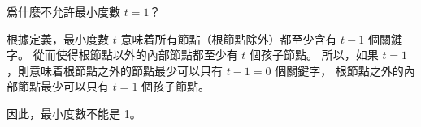 \startEXERCISE
爲什麼不允許最小度數 $t=1$？
\stopEXERCISE

\startANSWER
根據定義，最小度數 $t$ 意味着所有節點（根節點除外）都至少含有 $t-1$ 個關鍵字。
從而使得根節點以外的內部節點都至少有 $t$ 個孩子節點。
所以，如果 $t=1$，則意味着根節點之外的節點最少可以只有 $t-1=0$ 個關鍵字，
根節點之外的內部節點最少可以只有 $t=1$ 個孩子節點。

因此，最小度數不能是 1。
\stopANSWER
